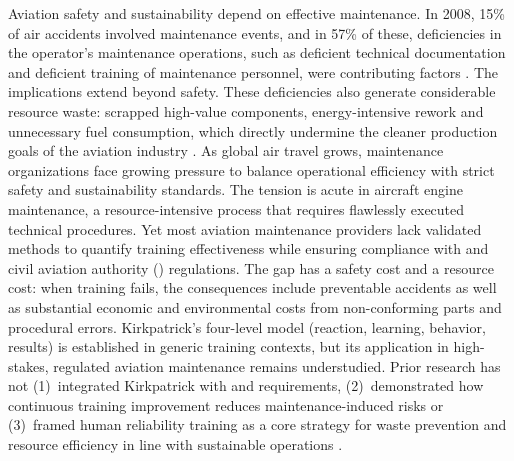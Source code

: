 Aviation safety and sustainability depend on effective maintenance. In 2008, 15\% of air accidents involved maintenance events, and in 57\% of these, deficiencies in the operator's maintenance operations, such as deficient technical documentation and deficient training of maintenance personnel, were contributing factors \parencite{IATA2009}.  The implications extend beyond safety. These deficiencies also generate considerable resource waste: scrapped high-value components, energy-intensive rework and unnecessary fuel consumption, which directly undermine the cleaner production goals of the aviation industry \parencite{Chen2023}. As global air travel grows, maintenance organizations face growing pressure to balance operational efficiency with strict safety and sustainability standards. The tension is acute in aircraft engine maintenance, a resource-intensive process that requires flawlessly executed technical procedures. Yet most aviation maintenance providers lack validated methods to quantify training effectiveness while ensuring compliance with \AS{} and civil aviation authority (\CAA{}) regulations. The gap has a safety cost and a resource cost: when training fails, the consequences include preventable accidents as well as substantial economic and environmental costs from non-conforming parts and procedural errors. Kirkpatrick's four-level model (reaction, learning, behavior, results) is established in generic training contexts, but its application in high-stakes, regulated aviation maintenance remains understudied. Prior research has not (1)~integrated Kirkpatrick with \AS{} and \CAA{} requirements, (2)~demonstrated how continuous training improvement reduces maintenance-induced risks or (3)~framed human reliability training as a core strategy for waste prevention and resource efficiency in line with sustainable operations \parencite{YangPark2024}.

